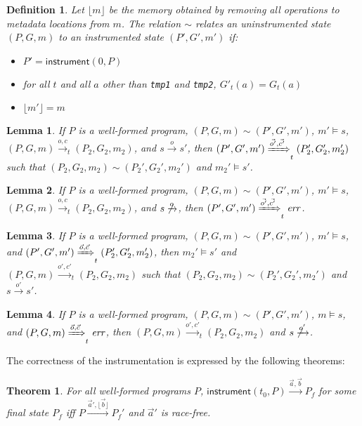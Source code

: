 \documentclass[preprint, 10pt]{sigplanconf}
\newcommand{\instr}[2]{\ensuremath{\mathsf{instrument}(#1, #2)}}
\newtheorem{lemma}{Lemma}
\newtheorem{theorem}{Theorem}
\newtheorem{definition}{Definition}
\begin{document}
\begin{definition}Let $\lfloor m\rfloor$ be the memory obtained by removing all operations to metadata locations from $m$. The relation $\sim$ relates an uninstrumented state $(P, G, m)$ to an instrumented state $(P', G', m')$ if:
\begin{itemize}
\item $P' = \instr{0}{P}$
\item for all $t$ and all $a$ other than \texttt{tmp1} and \texttt{tmp2}, $G'_t(a) = G_t(a)$
\item $\lfloor m' \rfloor = m$
\end{itemize}
\end{definition}
\begin{lemma}If $P$ is a well-formed program, $(P, G, m) \sim (P', G', m')$, $m' \models s$, $(P, G, m) \xrightarrow{o, c}_t (P_2, G_2, m_2)$, and $s \xrightarrow{o} s'$, then $(P', G', m') \xRightarrow{\vec{o'}, \vec{c'}}_t (P_2', G_2', m_2')$ such that $(P_2, G_2, m_2) \sim (P_2', G_2', m_2')$ and $m_2' \models s'$.\end{lemma}
\begin{lemma}If $P$ is a well-formed program, $(P, G, m) \sim (P', G', m')$, $m' \models s$, $(P, G, m) \xrightarrow{o, c}_t (P_2, G_2, m_2)$, and $s \not\xrightarrow{o}$, then $(P', G', m') \xRightarrow{\vec{o'}, \vec{c'}}_t \mathit{err}$.\end{lemma}
\begin{lemma}If $P$ is a well-formed program, $(P, G, m) \sim (P', G', m')$, $m' \models s$, and $(P', G', m') \xRightarrow{\vec{o}, \vec{c}}_t (P_2', G_2', m_2')$, then $m_2' \models s'$ and $(P, G, m) \xrightarrow{o', c'}_t (P_2, G_2, m_2)$ such that $(P_2, G_2, m_2) \sim (P_2', G_2', m_2')$ and $s \xrightarrow{o'} s'$.\end{lemma}
\begin{lemma}If $P$ is a well-formed program, $(P, G, m) \sim (P', G', m')$, $m \models s$, and $(P, G, m) \xRightarrow{\vec{o}, \vec{c}}_t \mathit{err}$, then $(P, G, m) \xrightarrow{o', c'}_t (P_2, G_2, m_2)$ and $s \not\xrightarrow{o'}$.\end{lemma}

The correctness of the instrumentation is expressed by the following theorems:
\begin{theorem}\label{safe}For all well-formed programs $P$, $\instr{t_0}{P} \xrightarrow{\vec{a}, \vec{b}} P_f$ for some final state $P_f$ iff $P \xrightarrow{\vec{a}', \lfloor\vec{b}\rfloor} P_f'$ and $\vec{a}'$ is race-free.\end{theorem}
\end{document}
